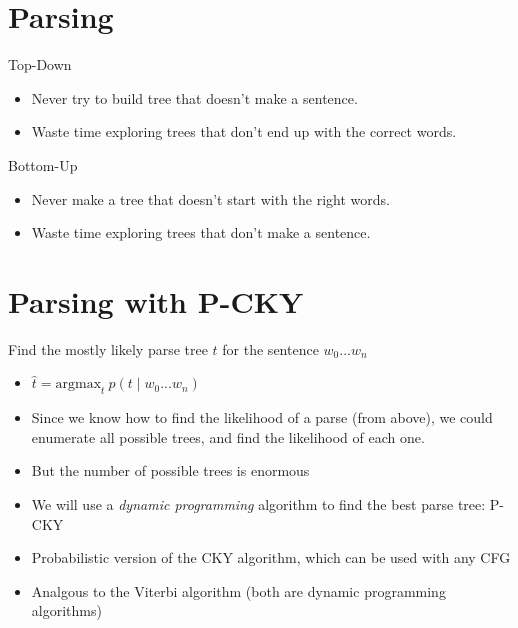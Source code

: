 \documentclass[11pt,letterpaper]{article}
\begin{document}
\section{Parsing}

Top-Down
\begin{itemize}
  \item Never try to build tree that doesn't make a sentence.
  \item Waste time exploring trees that don't end up with the correct words.
\end{itemize}

Bottom-Up
\begin{itemize}
  \item Never make a tree that doesn't start with the right words.
  \item Waste time exploring trees that don't make a sentence.
\end{itemize}


\section{Parsing with P-CKY}

Find the mostly likely parse tree $t$ for the sentence $w_0...w_n$
\begin{itemize}
  \item $ \hat{t} = \text{argmax}_t~p(t \mid w_0...w_n) $
  \item Since we know how to find the likelihood of a parse (from above), we could enumerate all possible trees, and find the likelihood of each one.
  \item But the number of possible trees is enormous
  \item We will use a \textit{dynamic programming} algorithm to find the best parse tree: P-CKY
  \item Probabilistic version of the CKY algorithm, which can be used with any CFG
  \item Analgous to the Viterbi algorithm (both are dynamic programming algorithms)
\end{itemize}
\end{document}

